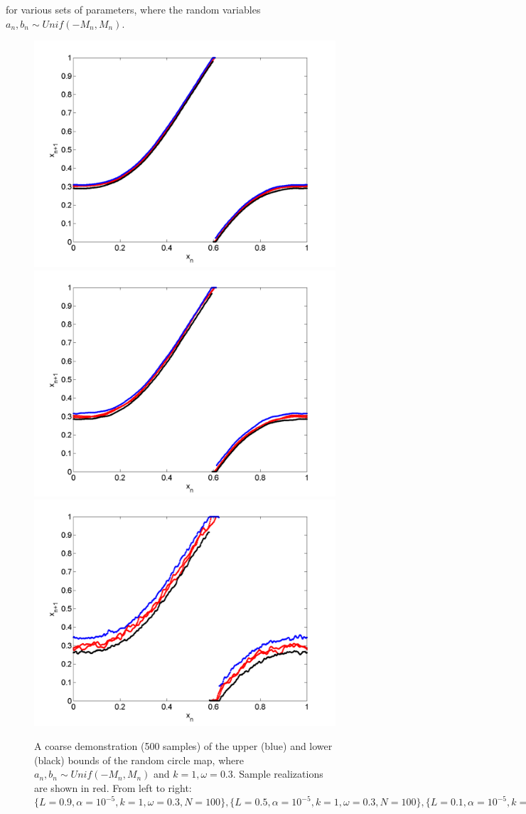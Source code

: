 for various sets of parameters, where the random variables
$a_n,b_n\sim Unif(-M_n,M_n)$. 
\begin{figure}[htp]
\caption[Upper and lower bounds on the random circle map, Uniform
distribution for $k=1,\omega=0.3$]{A coarse
  demonstration (500 samples) of the upper (blue) and lower (black)
  bounds of the random circle map, where $a_n,b_n\sim Unif(-M_n,M_n)$
  and $k=1,\omega=0.3$. Sample realizations are shown in red. From left to right:
  $\{L=0.9,\alpha = 10^{-5},k=1,\omega=0.3,N=100\}, \{L=0.5,\alpha = 10^{-5},k=1,\omega=0.3,N=100\},\{L=0.1,\alpha = 10^{-5},k=1,\omega=0.3,N=100\},$
  }\label{fig:circ_u_envelope1}
\centering
\includegraphics[width=.3\textwidth]{figs/envelope_unif_500_k1_L09_w03.png}\hfill
\includegraphics[width=.3\textwidth]{figs/envelope_unif_500_k1_L05_w03.png}\hfill
\includegraphics[width=.3\textwidth]{figs/envelope_unif_500_k1_L01_w03.png}
\end{figure}

